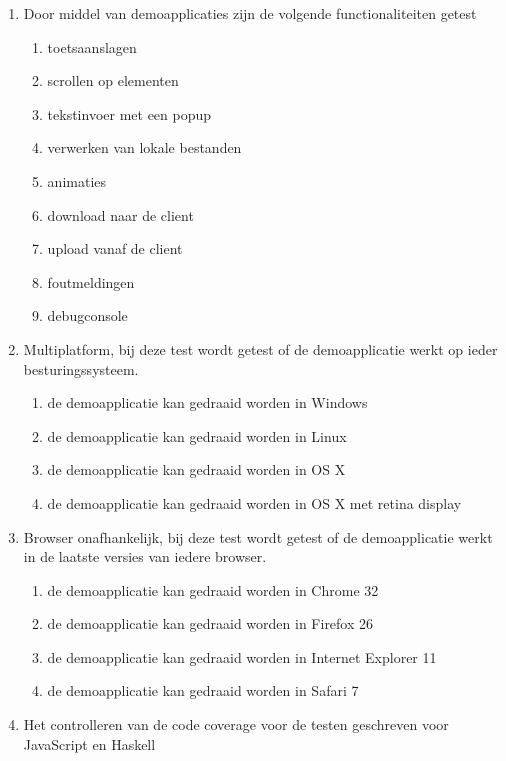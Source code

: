 \begin{enumerate}[label={T\arabic*}]
	\setcounter{enumi}{\value{startvaluetest}}
	\item \label{test:blackbox:demo} Door middel van demoapplicaties zijn de volgende functionaliteiten getest
    \begin{enumerate}[label={T\arabic{enumi}.\arabic*}]
		\item \label{test:blackbox:keyevents} toetsaanslagen
		\item \label{test:blackbox:scrollevents} scrollen op elementen
		\item \label{test:blackbox:prompt} tekstinvoer met een popup
		\item \label{test:blackbox:lokalebestanden} verwerken van lokale bestanden
		\item \label{test:blackbox:animatie} animaties
		\item \label{test:blackbox:download} download naar de client
		\item \label{test:blackbox:upload} upload vanaf de client
		\item \label{test:blackbox:error} foutmeldingen
		\item \label{test:blackbox:debug} debugconsole
	\end{enumerate}
	\item \label{test:blackbox:multiplatform} Multiplatform, bij deze test wordt getest of de demoapplicatie werkt op ieder besturingssysteem.
    \begin{enumerate}[label={T\arabic{enumi}.\arabic*}]
    	\item de demoapplicatie kan gedraaid worden in Windows
    	\item de demoapplicatie kan gedraaid worden in Linux
    	\item de demoapplicatie kan gedraaid worden in OS X
    	\item de demoapplicatie kan gedraaid worden in OS X met retina display
    \end{enumerate}
	\item \label{test:blackbox:browser} Browser onafhankelijk, bij deze test wordt getest of de demoapplicatie werkt in de laatste versies van iedere browser.
    \begin{enumerate}[label={T\arabic{enumi}.\arabic*}]
    	\item de demoapplicatie kan gedraaid worden in Chrome 32
    	\item de demoapplicatie kan gedraaid worden in Firefox 26
    	\item de demoapplicatie kan gedraaid worden in Internet Explorer 11
    	\item de demoapplicatie kan gedraaid worden in Safari 7
    \end{enumerate}
	\item \label{test:blackbox:coverage} Het controlleren van de code coverage voor de testen geschreven voor JavaScript en Haskell
\end{enumerate}

